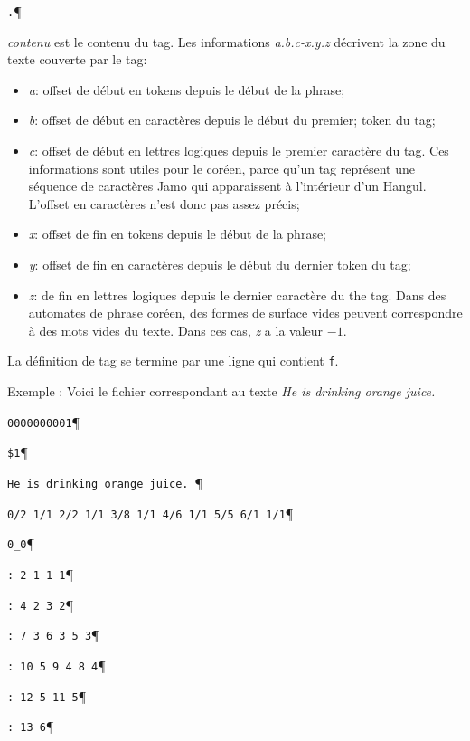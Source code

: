 \noindent \verb$.$\P


\bigskip
\noindent \textit{contenu} est le contenu du tag. Les informations \textit{a.b.c-x.y.z}
décrivent la zone du texte couverte par le tag:

\begin{itemize}
\item \textit{a}: offset de début en tokens depuis le début de la phrase;
\item \textit{b}: offset de début en caractères depuis le début du premier;
	token du tag;
\item \textit{c}: offset de début en lettres logiques depuis le premier caractère du 
	tag. Ces informations sont utiles pour le coréen, parce qu'un tag
    	    représent une séquence de caractères Jamo qui apparaissent à l'intérieur d'un Hangul. L'offset en caractères n'est donc pas assez précis;
    \item \textit{x}: offset de fin en tokens depuis le début de la phrase;
    \item \textit{y}: offset de fin en caractères depuis le début du dernier token du tag;
    \item \textit{z}: de fin en lettres logiques depuis le dernier caractère du
    	    the tag. Dans des automates de phrase coréen, des formes de surface vides peuvent correspondre à des mots vides du texte. Dans ces cas, \textit{z} a la valeur $-1$.
\end{itemize}

\bigskip
\noindent La définition de tag se termine par une ligne qui contient \verb+f+.

\bigskip
\noindent Exemple : Voici le fichier correspondant au texte \textit{He is
drinking orange juice.}

\bigskip
\noindent\verb$0000000001$\P

\noindent\verb+$1+\P

\noindent\verb$He is drinking orange juice. $\P

\noindent\verb$0/2 1/1 2/2 1/1 3/8 1/1 4/6 1/1 5/5 6/1 1/1$\P

\noindent\verb$0_0$\P

\noindent\verb$: 2 1 1 1$\P

\noindent\verb$: 4 2 3 2$\P

\noindent\verb$: 7 3 6 3 5 3$\P

\noindent\verb$: 10 5 9 4 8 4$\P

\noindent\verb$: 12 5 11 5$\P

\noindent\verb$: 13 6$\P

